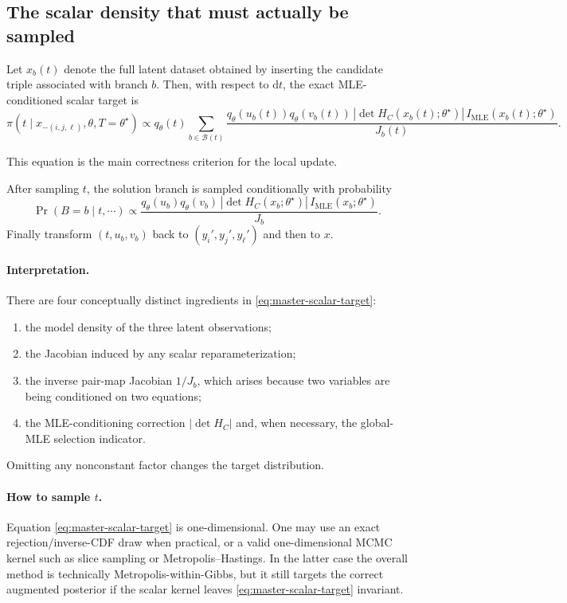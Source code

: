 \documentclass[11pt]{article}
\newcommand{\1}{\mathbf{1}}
\newcommand{\dd}{\mathrm{d}}
\newcommand{\MLE}{\mathrm{MLE}}
\begin{document}
\subsection{The scalar density that must actually be sampled}

Let $x_b(t)$ denote the full latent dataset obtained by inserting the candidate triple associated with branch $b$.  Then, with respect to $\dd t$, the exact MLE-conditioned scalar target is
\begin{equation}
\boxed{
\pi(t\mid x_{-(i,j,\ell)},\theta,T=\theta^\star)
\propto
q_\theta(t)
\sum_{b\in\mathcal B(t)}
\frac{
q_\theta(u_b(t))q_\theta(v_b(t))
\,|\det H_C(x_b(t);\theta^\star)|
\,I_{\MLE}(x_b(t);\theta^\star)
}{J_b(t)}.
}
\label{eq:master-scalar-target}
\end{equation}

This equation is the main correctness criterion for the local update.

After sampling $t$, the solution branch is sampled conditionally with probability
\begin{equation}
\boxed{
\Pr(B=b\mid t,\cdots)
\propto
\frac{
q_\theta(u_b)q_\theta(v_b)
\,|\det H_C(x_b;\theta^\star)|
\,I_{\MLE}(x_b;\theta^\star)
}{J_b}.
}
\label{eq:branch-weight-generic}
\end{equation}
Finally transform $(t,u_b,v_b)$ back to $(y_i',y_j',y_\ell')$ and then to $x$.

\paragraph{Interpretation.}
There are four conceptually distinct ingredients in \eqref{eq:master-scalar-target}:
\begin{enumerate}[label=(\alph*)]
    \item the model density of the three latent observations;
    \item the Jacobian induced by any scalar reparameterization;
    \item the inverse pair-map Jacobian $1/J_b$, which arises because two variables are being conditioned on two equations;
    \item the MLE-conditioning correction $|\det H_C|$ and, when necessary, the global-MLE selection indicator.
\end{enumerate}
Omitting any nonconstant factor changes the target distribution.

\paragraph{How to sample $t$.}
Equation \eqref{eq:master-scalar-target} is one-dimensional.  One may use an exact rejection/inverse-CDF draw when practical, or a valid one-dimensional MCMC kernel such as slice sampling or Metropolis--Hastings.  In the latter case the overall method is technically Metropolis-within-Gibbs, but it still targets the correct augmented posterior if the scalar kernel leaves \eqref{eq:master-scalar-target} invariant.
\end{document}
